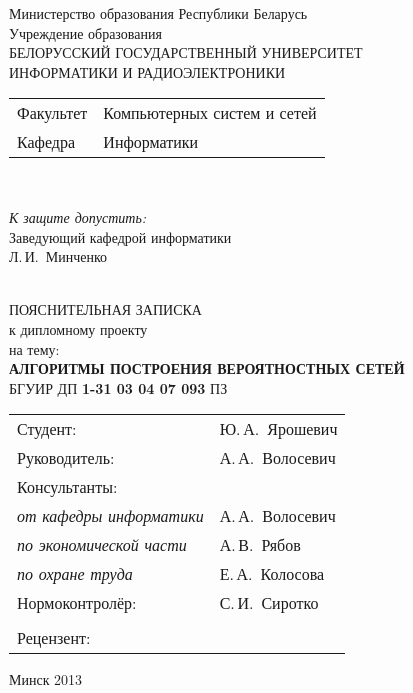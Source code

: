 \begin{titlepage}
  \begin{center}
    Министерство образования Республики Беларусь\\[1em]
    Учреждение образования\\
    БЕЛОРУССКИЙ ГОСУДАРСТВЕННЫЙ УНИВЕРСИТЕТ \\
    ИНФОРМАТИКИ И РАДИОЭЛЕКТРОНИКИ\\[1em]

    \begin{minipage}{\textwidth}
      \begin{flushleft}
        \begin{tabular}{ l l }
          Факультет & Компьютерных систем и сетей\\
          Кафедра   & Информатики
        \end{tabular}
      \end{flushleft}
    \end{minipage}\\[1em]

    \begin{minipage}{\textwidth}
      \begin{flushright}
        \textit{К защите допустить:}\\
        Заведующий кафедрой информатики\\
        \underline{\hspace*{4.5cm}} Л.\,И.~Минченко
      \end{flushright}
    \end{minipage}\\[3em]

    {ПОЯСНИТЕЛЬНАЯ ЗАПИСКА}\\
    {к дипломному проекту}\\
    {на тему:}\\[1em]
    \textbf{\large АЛГОРИТМЫ ПОСТРОЕНИЯ ВЕРОЯТНОСТНЫХ СЕТЕЙ}\\[1em]


    {БГУИР ДП \textbf{1-31 03 04 07 093} ПЗ}\\[2em]
    
    \begin{tabular}{ p{}p{} }
      Студент: & Ю.\,А.~Ярошевич \\
      Руководитель: & А.\,А.~Волосевич \\
      Консультанты: &\\
      \hspace*{3ex}\emph{от кафедры информатики} & А.\,А.~Волосевич \\
      \hspace*{3ex}\emph{по экономической части} & А.\,В.~Рябов \\
      \hspace*{3ex}\emph{по охране труда} & Е.\,А.~Колосова \\
      Нормоконтролёр: & С.\,И.~Сиротко\\
      & \\
      Рецензент: &
    \end{tabular}
    
    \vfill
    {\normalsize Минск 2013}
  \end{center}
\end{titlepage}
